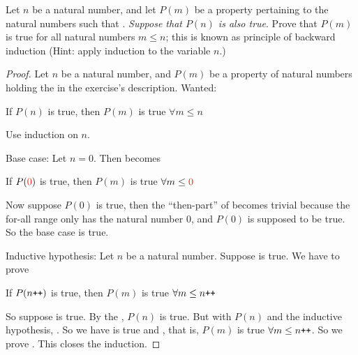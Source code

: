 \begin{exercise}\label{exercise 2.2.6}
Let \(n\) be a natural number, and let \(P(m)\) be a property pertaining to the natural numbers such that . \emph{Suppose that \(P(n)\) is also true}. Prove that \(P(m)\) is true for all natural numbers \(m \leq n\); this is known as principle of backward induction (Hint: apply induction to the variable \(n\).)
\end{exercise}
\begin{proof}
Let \(n\) be a natural number, and \(P(m)\) be a property of natural numbers holding the  in the exercise's description.
Wanted:
    \begin{center}
    If \(P(n)\) is true, then \(P(m)\) is true \(\forall m \leq n\)    
    \end{center}

Use induction on \(n\).

Base case: Let \(n = 0\). Then  becomes
    \begin{center}
    If \(P(\RED{0})\) is true, then \(P(m)\) is true \(\forall m \leq \RED{0}\) 
    \end{center}
Now suppose \(P(0)\) is true, then the ``then-part'' of  becomes trivial because the for-all range only has the natural number \(0\), and \(P(0)\) is supposed to be true. So the base case is true.

Inductive hypothesis: Let \(n\) be a natural number. Suppose  is true. We have to prove
    \begin{center}
    If \(P(n\texttt{++})\) is true, then \(P(m)\) is true \(\forall m \leq n\texttt{++}\)    
    \end{center}
So suppose  is true. By the , \(P(n)\) is true. But with \(P(n)\) and the inductive hypothesis, . So we have  is true and , that is, \(P(m)\) is true \(\forall m \leq n\texttt{++}\). So we prove . This closes the induction.
\end{proof}

